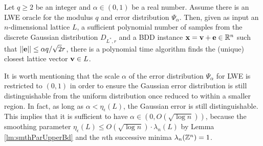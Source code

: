 \documentclass[../main.tex]{subfiles}
\begin{document}
\begin{proposition}
\label{prop:bddToLWE}
Let 
\reversemarginpar
{}
$q \ge 2$ be an integer and $\alpha \in (0,1)$ be a real number. Assume there is an LWE oracle for the modulus $q$ and error distribution $\Psi_{\alpha}$. Then, given as input 
an $n$-dimensional lattice $L$, 
a sufficient polynomial number of samples from the discrete Gaussian distribution $D_{L^*, r}$ %
and a BDD instance $\mathbf{x} =\mathbf{v}+\mathbf{e} \in \mathbb{R}^n$ such that $||\mathbf{e}|| \le \alpha q/\sqrt{2}r$, there is a polynomial time algorithm finds the (unique) closest lattice vector $\mathbf{v} \in L$.
\end{proposition}

It is worth mentioning that the scale $\alpha$ of the error distribution $\Psi_{\alpha}$ for LWE is restricted to $(0,1)$ in order to ensure the Gaussian error distribution is still distinguishable from the uniform distribution once reduced to within a smaller region. In fact, as long as $\alpha < \eta_{\epsilon}(L)$, the Gaussian error is still distinguishable. This implies that it is sufficient to have $\alpha \in (0, O(\sqrt{\log n}))$, because the smoothing parameter $\eta_{\epsilon}(L) \le O(\sqrt{\log n}) \cdot \lambda_n(L)$ by Lemma \ref{lm:smthParUpperBd} and the $n$th successive minima $\lambda_n(\mathbb{Z}^n)=1$.
\end{document}
